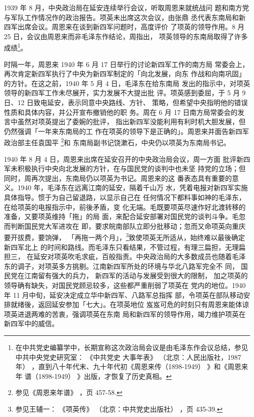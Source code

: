1939 年 8 月，中央政治局在延安连续举行会议，听取周恩来就统战问
题和南方党与军队工作情况作的政治报告。项英未出席这次会议，由张鼎
丞代表东南局和新四军出席会议。周恩来在谈到新四军问题时，高度评价
了项英的领导作用。8 月 25 日，会议由周恩来而非毛泽东作结论，周指出，
项英领导的东南局取得了许多成绩\footnote{在中共党史编纂学中，长期宣称这次政治局会议是由毛泽东作会议总结，参见中共中央党史研究室：
《中共党史
大事年表》
（北京：人民出版社，1987 年）
，直到八十年代末、九十年代初《周恩来传（1898-1949）
》和《周恩来年
谱（1898-1949）
》出版，才恢复了历史真相。}。

时隔一年，周恩来 1940 年 6 月 17 日举行的讨论新四军工作的南方局
常委会上，再次肯定新四军执行了中央为新四军制定的「向北发展，向东
作战和向南巩固」的方针。在这之前，1940 年 5 月 4 日，毛泽东在给东南局
发出的指示中，对项英领导的新四军工作未尽展开，实力发展不大提出批
评。项英感到委屈，于 5 月 9 日、12 日致电延安，表示同意中央路线、方针、
策略，但希望中央指明他的错误性质和具体内容，并公开宣布撤销他的职
务。周在 6 月 17 日南方局常委会的发言中虽然对项英提出了委婉的批评，
指出新四军没能利用有利时机大胆发展，但仍然强调「一年来东南局的工
作在项英的领导下是正确的」。周恩来并面告新四军政治部主任袁国平
\footnote{参见《周恩来年谱》
，页 457-58.}和
东南局副书记饶漱石，中央仍以项英为东南局书记。

1940 年 8 月 4 日，周恩来出席在延安召开的中央政治局会议，周一方面
批评新四军未积极执行中央向北发展的方针，在与国民党的谈判中也未坚
持党的立场；但同时，周再次提出，东南局仍以项英为书记。周恩来的这
番表态具有重要的意义。1940 年，毛泽东在远离江南的延安，隔着千山万
水，凭着电报对新四军实施具体指导。惯于为自己留退路，以显示自己在
任何情况下都料事如神的毛泽东，在给项英的电报指示中，前後矛盾，变
化无端。毛既要项英尽速作好北渡转移的准备，又要项英维持「拖」的局
面，来配合延安部署对国民党的谈判斗争。毛忽而判断国民党大军进攻在
即，要求皖南部队立即分批移动；忽而又命项英向重庆要开拔费，要饷弹，
「再拖一两个月」，\footnote{参见王辅一：
《项英传》
（北京：中共党史出版社）
，页 435-39.}致使项英无所适从，始终难以最後确定新四军北上
的时间和路线。而毛泽东只看结果，不管过程，有理三扁担，无理扁担三，
在延安对项英吹毛求疵，百般指责。中央政治局的大多数成员也随着毛泽
东的调子，对项英多方挑剔。江南新四军所处的环境与华北八路军完全不
同，
国民党在江南留有强大的兵力，
新四军的活动与发展受到很大的限制，
加之项英的领导确有缺失，对国民党顾忌较多，这些都严重削弱了项英在
党内的地位。1940 年 11 月中旬，延安决定成立华中新四军、八路军总指挥
部，令项英在部队移动安排就绪後，返回延安参加「七大」。在项英地位
岌岌可危的时刻只有周恩来能体谅项英进退两难的苦衷，强调项英在东南
局和新四军的领导作用，竭力维护项英在新四军中的威信。

